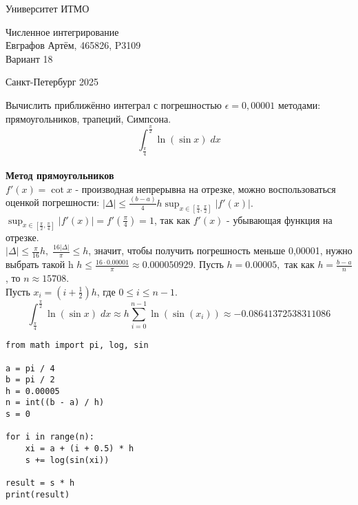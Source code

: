 


\thispagestyle{empty}
\begin{center}
\LARGE{Университет ИТМО} 
\vspace{20pt}

\vspace{180pt}

\LARGE{Численное интегрирование \\
Евграфов Артём, 465826, P3109\\ 
Вариант 18 \\}
\vspace{335pt}
\end{center}

\begin{center}
\Large{Санкт-Петербург 2025}
\end{center}

\newpage
\setcounter{page}{1}
\noindent Вычислить приближённо интеграл с погрешностью $\epsilon = 0,00001$  методами: прямоугольников, трапеций, Симпсона. 
\[\int_{\frac{\pi}{4}}^{\frac{\pi}{2}} \ln(\sin{x}) \; dx\] \\

\noindent \textbf{Метод прямоугольников} \\
\(f'(x) = \cot{x}\) - производная непрерывна на отрезке, можно воспользоваться оценкой погрешности: \(\displaystyle |\Delta| \leq \frac{(b-a)}{4} h \sup_{x \in[\frac{\pi}{4}, \frac{\pi}{2}]} |f'(x)|.\) \\
\(\displaystyle \sup_{x \in [\frac{\pi}{2},\frac{\pi}{4}]} |f'(x)| = f'(\frac{\pi}{4}) = 1\), так как $f'(x)$ - убывающая функция на отрезке. \\
$|\Delta| \leq \frac{\pi}{16}h, \; \frac{16|\Delta|}{\pi} \leq h$, значит, чтобы получить погрешность меньше 0,00001, нужно выбрать такой h
$h \leq \frac{16 \cdot 0.00001}{\pi} \approx 0.000050929$.
Пусть $h = 0.00005, $ так как $h = \frac{b - a}{n}$, то $n \approx 15708$. \\
Пусть $x_i = \left(i + \frac{1}{2} \right)h$, где $0 \leq i \leq n - 1$. \\
\[\int_{\frac{\pi}{4}}^{\frac{\pi}{2}} \ln(\sin{x}) \; dx \approx h\sum_{i = 0}^{n - 1}\ln{\left(\sin{\left(x_i\right)}\right)} \approx -0.08641372538311086\]
\begin{verbatim}
from math import pi, log, sin

a = pi / 4
b = pi / 2
h = 0.00005
n = int((b - a) / h)
s = 0

for i in range(n):
    xi = a + (i + 0.5) * h
    s += log(sin(xi))

result = s * h
print(result)
\end{verbatim}

